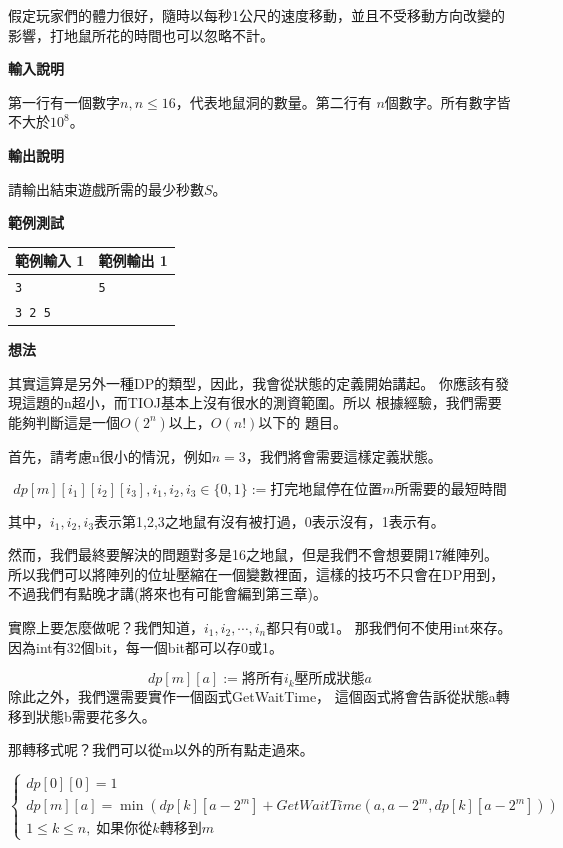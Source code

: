     假定玩家們的體力很好，隨時以每秒1公尺的速度移動，並且不受移動方向改變的影響，打地鼠所花的時間也可以忽略不計。

    \textbf{輸入說明}

    第一行有一個數字$n, n \le 16$，代表地鼠洞的數量。第二行有 
    $n$個數字。所有數字皆不大於$10^8$。

    \textbf{輸出說明}

    請輸出結束遊戲所需的最少秒數$S$。

    \textbf{範例測試}

    \begin{tabular}{|m{7cm}|m{7cm}|}
        \hline
        範例輸入 1 & 範例輸出 1 \\
        \hline
        \verb|3| & \verb|5| \\
        \verb|3 2 5| & \\
        \hline
    \end{tabular}

    \textbf{想法}

    其實這算是另外一種DP的類型，因此，我會從狀態的定義開始講起。
    你應該有發現這題的n超小，而TIOJ基本上沒有很水的測資範圍。所以
    根據經驗，我們需要能夠判斷這是一個$O(2^n)$以上，$O(n!)$以下的
    題目。

    首先，請考慮n很小的情況，例如$n=3$，我們將會需要這樣定義狀態。

    $$dp[m][i_1][i_2][i_3], i_1,i_2,i_3 \in \{0, 1\} := 打完地鼠停在位置m所需要的最短時間$$

    其中，$i_1,i_2,i_3$表示第1,2,3之地鼠有沒有被打過，0表示沒有，1表示有。

    然而，我們最終要解決的問題對多是16之地鼠，但是我們不會想要開17維陣列。
    所以我們可以將陣列的位址壓縮在一個變數裡面，這樣的技巧不只會在DP用到，
    不過我們有點晚才講(將來也有可能會編到第三章)。

    實際上要怎麼做呢？我們知道，$i_1,i_2, \cdots , i_n$都只有0或1。
    那我們何不使用int來存。因為int有32個bit，每一個bit都可以存0或1。

    $$dp[m][a] := 將所有i_k壓所成狀態a$$
    除此之外，我們還需要實作一個函式GetWaitTime，
    這個函式將會告訴從狀態a轉移到狀態b需要花多久。

    那轉移式呢？我們可以從m以外的所有點走過來。

    $$
    \begin{cases}
        dp[0][0]=1 \\
        dp[m][a]=\min (dp[k][a-2^{m}]+GetWaitTime(a,a-2^m,dp[k][a-2^m])) \\ 
        1 \le k \le n, \; 如果你從k轉移到m
    \end{cases}
    $$

